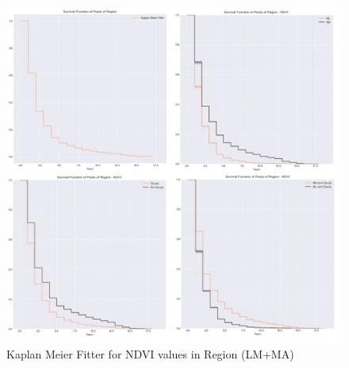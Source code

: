 \begin{figure}[H]
  \centering
  \includegraphics[width=1\textwidth]{KM_NDVI_complete.jpg}
\caption{Kaplan Meier Fitter for NDVI values in Region (LM+MA)}
\label{fig:km-total}
\end{figure}

